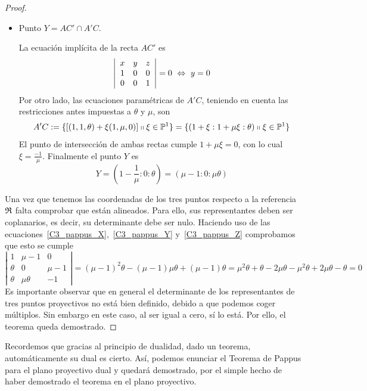 \begin{proof}
\begin{itemize}
		
		\item Punto $Y=AC'\cap A'C$.
		
		La ecuación implícita de la recta $AC'$ es
		\begin{equation*}
			\left| \begin{array}{ccc}
				x & y & z\\
				1 & 0 & 0\\
				0 & 0 & 1
			\end{array}\right| =0 \ \Leftrightarrow \ y=0
		\end{equation*}
		Por otro lado, las ecuaciones paramétricas de $A'C$, teniendo en cuenta las restricciones antes impuestas a $\theta$ y $\mu$, son
		\begin{equation*}
			A'C:=\{[(1,1,\theta)+\xi(1,\mu,0)]\shortparallel \xi\in\mathbb{P}^1\}=\{(1+\xi:1+\mu\xi:\theta)\shortparallel \xi\in\mathbb{P}^1\}
		\end{equation*}
		El punto de intersección de ambas rectas cumple $1+\mu\xi=0$, con lo cual $\xi=\frac{-1}{\mu}$. Finalmente el punto $Y$ es
		\begin{equation}
			\label{C3_pappus_Y}
			Y=(1-\frac{1}{\mu}:0:\theta)=(\mu-1:0:\mu\theta)
		\end{equation}
		
	\end{itemize}
	Una vez que tenemos las coordenadas de los tres puntos respecto a la referencia $\mathfrak{R}$ falta comprobar que están alineados. Para ello, sus representantes deben ser coplanarios, es decir, su determinante debe ser nulo. Haciendo uso de las ecuaciones~\eqref{C3_pappus_X},~\eqref{C3_pappus_Y} y~\eqref{C3_pappus_Z} comprobamos que esto se cumple
	\begin{equation*}
		\left| \begin{array}{ccc}
			1 & \mu-1 & 0\\
			\theta & 0 & \mu-1\\
			\theta & \mu\theta & -1
		\end{array}\right| =(\mu-1)^2\theta-(\mu-1)\mu\theta+(\mu-1)\theta=\mu^2\theta+\theta-2\mu\theta-\mu^2\theta+2\mu\theta-\theta=0
	\end{equation*}
	Es importante observar que en general el determinante de los representantes de tres puntos proyectivos no está bien definido, debido a que podemos coger múltiplos. Sin embargo en este caso, al ser igual a cero, sí lo está. Por ello, el teorema queda demostrado.
\end{proof}
Recordemos que gracias al principio de dualidad, dado un teorema, automáticamente su dual es cierto. Así, podemos enunciar el Teorema de Pappus para el plano proyectivo dual y quedará demostrado, por el simple hecho de haber demostrado el teorema en el plano proyectivo.
